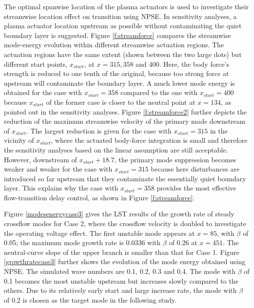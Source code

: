 The optimal spanwise location of the plasma actuators is used to investigate their streamwise location effect on transition using NPSE. In sensitivity analyses, a plasma actuator location upstream as possible without contaminating the quiet boundary layer is suggested. Figure \ref{f:streamforce} compares the streamwise mode-energy evolution within different streamwise actuation regions. The actuation regions have the same extent (shown between the two large dots) but different start points, $x_{start}$, at $x=315, 358$ and 400. Here, the body force's strength is reduced to one tenth of the original, because too strong force at upstream will contaminate the boundary layer. A much lower mode energy is obtained for the case with $x_{start}=358$ compared to the one with $x_{start}=400$ because $x_{start}$ of the former case is closer to the neutral point at $x=134$, as pointed out in the sensitivity analyses. Figure \ref{f:streamforce2} further depicts the reduction of the maximum streamwise velocity of the primary mode downstream of $x_{start}$. The largest reduction is given for the case with $x_{start}=315$ in the vicinity of $x_{start}$, where the actuated body-force integration is small and therefore the sensitivity analyses based on the linear assumption are still acceptable. However, downstream of $x_{start}+18.7$, the primary mode suppression becomes weaker and weaker for the case with $x_{start}=315$ because here disturbances are introduced so far upstream that they contaminate the essentially quiet boundary layer. This explains why the case with $x_{start}=358$ provides the most effective flow-transition delay control, as shown in Figure \ref{f:streamforce}.

Figure \ref{modesenergycase3} gives the LST results of the growth rate of steady crossflow modes for Case 2, where the crossflow velocity is doubled to investigate the operating voltage effect. The first unstable mode appears at $x =85$, with $\beta$ of 0.05; the maximum mode growth rate is 0.0336 with $\beta$ of 0.26 at $x =451$. The neutral-curve slope of the upper branch is smaller than that for Case 1. Figure \ref{growthratecase3} further shows the evolution of the mode energy obtained using NPSE. The simulated wave numbers are 0.1, 0.2, 0.3 and 0.4. The mode with $\beta$ of 0.1 becomes the most unstable upstream but increases slowly compared to the others. Due to its relatively early start and large increase rate, the mode with $\beta$ of 0.2 is chosen as the target mode in the following study.


